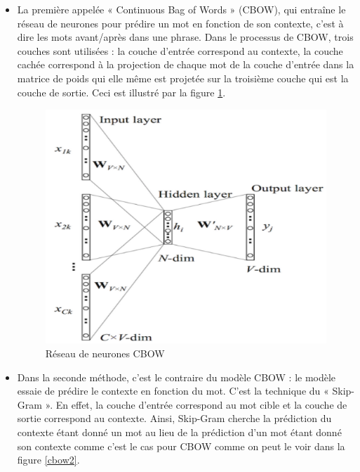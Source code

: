     \begin{itemize}
    \item La première appelée « Continuous Bag of Words » (CBOW), qui entraîne le réseau de neurones pour prédire un mot en fonction de son contexte, c’est à dire les mots avant/après dans une phrase. 
    Dans le processus de CBOW, trois couches sont utilisées : la couche d'entrée correspond au contexte, la couche cachée correspond à la projection de chaque mot de la couche d'entrée dans la matrice de poids qui elle même  est projetée sur la troisième couche qui est la couche de sortie. Ceci est illustré par la figure \ref{cbow1}.
   
        \begin{figure}[H]
            \centering
            \includegraphics[height=250pt,width=300pt]{img/chapter2/Cbow.png}
            \caption{Réseau de neurones CBOW}
            \label{cbow1}
        \end{figure}
        
    
    \item Dans la seconde méthode, c'est le contraire du modèle CBOW : le modèle essaie de prédire le contexte en fonction du mot. C’est la technique du « Skip-Gram ». En effet, la couche d'entrée correspond au mot cible et la couche de sortie correspond au contexte. Ainsi, Skip-Gram cherche la prédiction du contexte étant donné un mot au lieu de la prédiction d'un mot étant donné son contexte comme c'est le cas pour CBOW comme on peut le voir dans la figure \ref{cbow2}.
    

\end{itemize}
